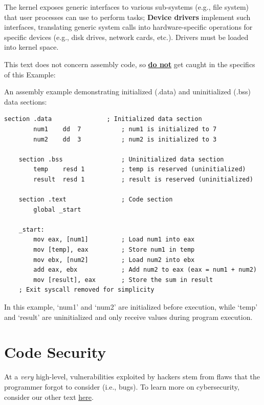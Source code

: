 \begin{Def}

  The kernel exposes generic interfaces to various sub-systems (e.g., file system) that user processes can use to perform tasks; \textbf{Device drivers} implement such interfaces,
  translating generic system calls into hardware-specific operations for specific devices (e.g., disk drives, network cards, etc.). Drivers must be loaded into kernel space.
\end{Def}

\noindent
This text does not concern assembly code, so \underline{\textbf{do not}} get caught in the specifics of this Example: 
\begin{Example}

    \label{ex:assembly_code}
    An assembly example demonstrating initialized (.data) and uninitialized (.bss) data sections:

    \begin{lstlisting}[language={[x86masm]Assembler}, numbers=none]
    section .data               ; Initialized data section
        num1    dd  7           ; num1 is initialized to 7
        num2    dd  3           ; num2 is initialized to 3

    section .bss                ; Uninitialized data section
        temp    resd 1          ; temp is reserved (uninitialized)
        result  resd 1          ; result is reserved (uninitialized)

    section .text               ; Code section
        global _start

    _start:
        mov eax, [num1]         ; Load num1 into eax
        mov [temp], eax         ; Store num1 in temp
        mov ebx, [num2]         ; Load num2 into ebx
        add eax, ebx            ; Add num2 to eax (eax = num1 + num2)
        mov [result], eax       ; Store the sum in result
    ; Exit syscall removed for simplicity
    \end{lstlisting}

    \noindent
    In this example, `num1' and `num2' are initialized before execution, while `temp' and `result' are uninitialized and only receive values during program execution.
\end{Example}

\newpage 
\section{Code Security}

At a \emph{very} high-level, vulnerabilities exploited by hackers stem from flaws that the programmer forgot to consider (i.e., bugs).
To learn more on cybersecurity, consider our other text \underline{\href{https://github.com/Concise-Works/Cyber-Security/blob/main/main.pdf}{here}}.

